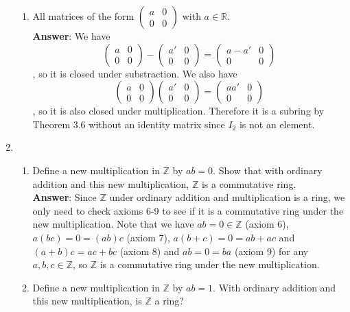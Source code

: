 \documentclass{article}
\begin{document}
\begin{enumerate}
\begin{enumerate}[start=2]
                  \item All matrices of the form $\begin{pmatrix}a&0\\0&0\end{pmatrix}$ with $a\in\mathbb{R}$.\\
                        \textbf{Answer}: We have \[\begin{pmatrix}a&0\\0&0\end{pmatrix}-\begin{pmatrix}a'&0\\0&0\end{pmatrix}=\begin{pmatrix}a-a'&0\\0&0\end{pmatrix}\], so it is closed under substraction. We also have \[\begin{pmatrix}a&0\\0&0\end{pmatrix}\begin{pmatrix}a'&0\\0&0\end{pmatrix}=\begin{pmatrix}aa'&0\\0&0\end{pmatrix}\], so it is also closed under multiplication. Therefore it is a subring by Theorem 3.6 without an identity matrix since $I_2$ is not an element.
            \end{enumerate}
      \item
            \begin{enumerate}
                  \item Define a new multiplication in $\mathbb{Z}$ by $ab=0$. Show that with ordinary addition and this new multiplication, $\mathbb{Z}$ is a commutative ring.\\
                        \textbf{Answer}: Since $\mathbb{Z}$ under ordinary addition and multiplication is a ring, we only need to check axioms 6-9 to see if it is a commutative ring under the new multiplication. Note that we have $ab=0\in\mathbb{Z}$ (axiom 6), $a(bc)=0=(ab)c$ (axiom 7), $a(b+c)=0=ab+ac$ and $(a+b)c=ac+bc$ (axiom 8) and $ab=0=ba$ (axiom 9) for any $a,b,c\in\mathbb{Z}$, so $\mathbb{Z}$ is a commutative ring under the new multiplication.
                  \item Define a new multiplication in $\mathbb{Z}$ by $ab=1$. With ordinary addition and this new multiplication, is $\mathbb{Z}$ a ring?\\

\end{enumerate}
\end{enumerate}
\end{document}
